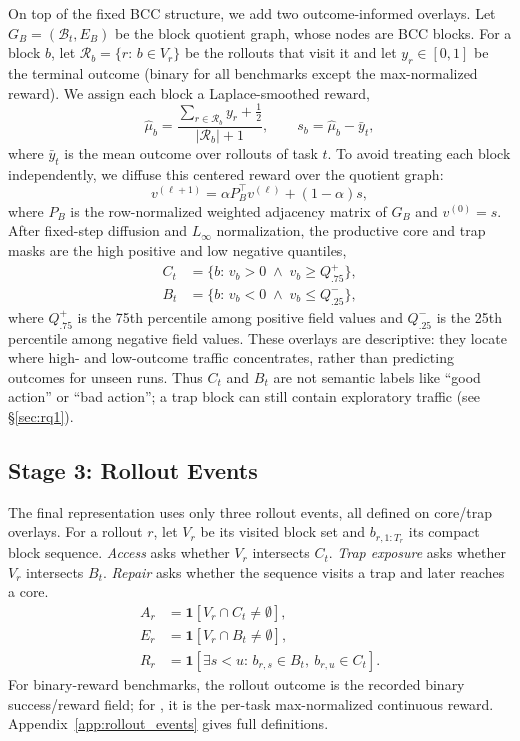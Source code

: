 On top of the fixed BCC structure, we add two outcome-informed overlays.
Let $G_B=(\mathcal{B}_t,E_B)$ be the block quotient graph, whose nodes are BCC blocks.
For a block $b$, let $\mathcal{R}_b=\{r:\,b\in V_r\}$ be the rollouts that visit it and let $y_r\in[0,1]$ be the terminal outcome (binary for all benchmarks except the max-normalized \mcp{} reward).
We assign each block a Laplace-smoothed reward,
\begin{equation}
\hat\mu_b=\frac{\sum_{r\in\mathcal{R}_b} y_r + \tfrac{1}{2}}{|\mathcal{R}_b|+1},
\qquad
s_b=\hat\mu_b-\bar y_t,
\label{eq:block_reward_main}
\end{equation}
where $\bar y_t$ is the mean outcome over rollouts of task $t$.
To avoid treating each block independently, we diffuse this centered reward over the quotient graph:
\begin{equation}
v^{(\ell+1)}=\alpha P_B^{\top}v^{(\ell)}+(1-\alpha)s,
\label{eq:reward_diffusion_main}
\end{equation}
where $P_B$ is the row-normalized weighted adjacency matrix of $G_B$ and $v^{(0)}=s$.
After fixed-step diffusion and $L_\infty$ normalization, the productive core and trap masks are the high positive and low negative quantiles,
\begin{align}
C_t &= \{b:\, v_b>0 \;\wedge\; v_b\ge Q^+_{.75}\}, \nonumber\\
B_t &= \{b:\, v_b<0 \;\wedge\; v_b\le Q^-_{.25}\},
\label{eq:core_trap_main}
\end{align}
where $Q^+_{.75}$ is the 75th percentile among positive field values and $Q^-_{.25}$ is the 25th percentile among negative field values.
These overlays are descriptive: they locate where high- and low-outcome traffic concentrates, rather than predicting outcomes for unseen runs.
Thus $C_t$ and $B_t$ are not semantic labels like ``good action'' or ``bad action''; a trap block can still contain exploratory traffic (see \S\ref{sec:rq1}).

\subsection{Stage 3: Rollout Events}
\label{sec:profiles}

The final \method{} representation uses only three rollout events, all defined on core/trap overlays.
For a rollout $r$, let $V_r$ be its visited block set and $b_{r,1:T_r}$ its compact block sequence.
\emph{Access} asks whether $V_r$ intersects $C_t$.
\emph{Trap exposure} asks whether $V_r$ intersects $B_t$.
\emph{Repair} asks whether the sequence visits a trap and later reaches a core.
\begin{align}
A_r &= \mathbf{1}[V_r\cap C_t\ne\emptyset], \nonumber\\
E_r &= \mathbf{1}[V_r\cap B_t\ne\emptyset], \nonumber\\
R_r &= \mathbf{1}[\exists s<u:\, b_{r,s}\in B_t,\ b_{r,u}\in C_t]. \label{eq:events_main}
\end{align}
For binary-reward benchmarks, the rollout outcome is the recorded binary success/reward field; for \mcp{}, it is the per-task max-normalized continuous reward.
Appendix~\ref{app:rollout_events} gives full definitions.

